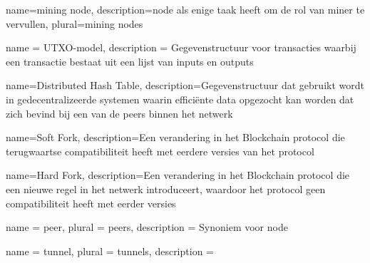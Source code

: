  {
  name={mining node},
  description={\Gls{node} als enige taak heeft om de rol van \gls{miner} te vervullen},
  plural={mining nodes}
}





 {
  name = {UTXO-model},
  description = {Gegevenstructuur voor transacties waarbij een transactie bestaat uit een lijst van inputs en outputs}
}

 {
  name={Distributed Hash Table},
  description={Gegevenstructuur dat gebruikt wordt in gedecentralizeerde systemen waarin efficiënte data opgezocht kan worden dat zich bevind bij een van de \glspl{peer} binnen het netwerk}
}

 {
  name={Soft Fork},
  description={Een verandering in het Blockchain protocol die terugwaartse compatibiliteit heeft met eerdere versies van het protocol}
}

 {
  name={Hard Fork},
  description={Een verandering in het Blockchain protocol die een nieuwe regel in het netwerk introduceert, waardoor het protocol geen compatibiliteit heeft met eerder versies}
}

 {
  name = {peer},
  plural = {peers},
  description = {Synoniem voor \gls{node}}
}

 {
  name = {tunnel},
  plural = {tunnels},
  description = {}
}

